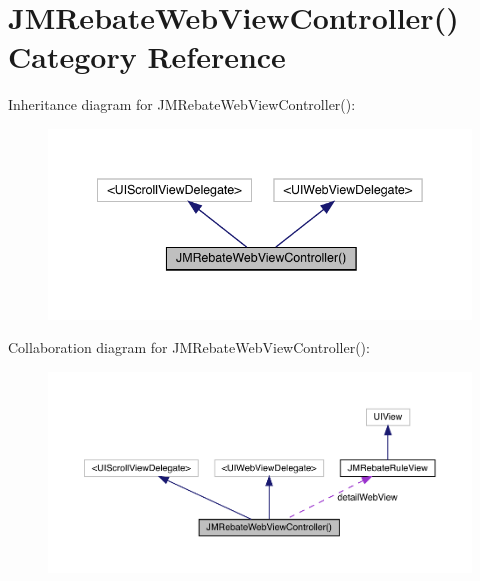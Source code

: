 \hypertarget{category_j_m_rebate_web_view_controller_07_08}{}\section{J\+M\+Rebate\+Web\+View\+Controller() Category Reference}
\label{category_j_m_rebate_web_view_controller_07_08}


Inheritance diagram for J\+M\+Rebate\+Web\+View\+Controller()\+:\nopagebreak
\begin{figure}[H]
\begin{center}
\leavevmode
\includegraphics[width=342pt]{category_j_m_rebate_web_view_controller_07_08__inherit__graph}
\end{center}
\end{figure}


Collaboration diagram for J\+M\+Rebate\+Web\+View\+Controller()\+:\nopagebreak
\begin{figure}[H]
\begin{center}
\leavevmode
\includegraphics[width=350pt]{category_j_m_rebate_web_view_controller_07_08__coll__graph}
\end{center}
\end{figure}
